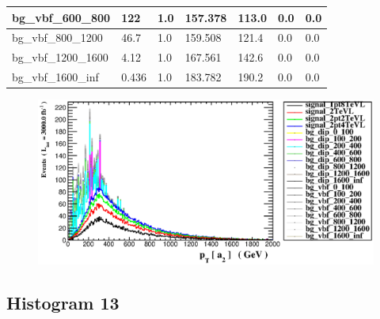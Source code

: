 \documentclass[a4paper, 10pt]{article}
\begin{document}
\begin{table}[H]
\begin{center}
\begin{tabular}{|m{23.0mm}|m{23.0mm}|m{18.0mm}|m{19.0mm}|m{19.0mm}|m{19.0mm}|m{19.0mm}|}
      \hline
      {\cellcolor{white}         bg\_vbf\_600\_800}& {\cellcolor{white}         122}& {\cellcolor{white}         1.0}& {\cellcolor{white}         157.378}& {\cellcolor{white}         113.0}& {\cellcolor{green}         0.0}& {\cellcolor{green}         0.0}\\
      \hline
      {\cellcolor{white}         bg\_vbf\_800\_1200}& {\cellcolor{white}         46.7}& {\cellcolor{white}         1.0}& {\cellcolor{white}         159.508}& {\cellcolor{white}         121.4}& {\cellcolor{green}         0.0}& {\cellcolor{green}         0.0}\\
      \hline
      {\cellcolor{white}         bg\_vbf\_1200\_1600}& {\cellcolor{white}         4.12}& {\cellcolor{white}         1.0}& {\cellcolor{white}         167.561}& {\cellcolor{white}         142.6}& {\cellcolor{green}         0.0}& {\cellcolor{green}         0.0}\\
      \hline
      {\cellcolor{white}         bg\_vbf\_1600\_inf}& {\cellcolor{white}         0.436}& {\cellcolor{white}         1.0}& {\cellcolor{white}         183.782}& {\cellcolor{white}         190.2}& {\cellcolor{green}         0.0}& {\cellcolor{green}         0.0}\\
\hline
    \end{tabular}
  \end{center}
\end{table}

\begin{figure}[H]
  \begin{center}
    \includegraphics[scale=0.45]{selection_11.eps}\\
\caption{   }
  \end{center}
\end{figure}
      \newpage
\subsection{ Histogram 13}
\end{document}
